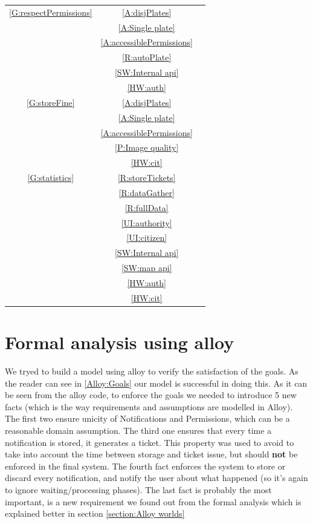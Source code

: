 \documentclass{article}
\begin{document}
\begin{table}[H]
\begin{center}
\begin{tabular}{|c|c|c|}
			\hline
				\ref{G:respectPermissions}	&\ref{A:disjPlates}						&\\
											&\ref{A:Single plate}					&\\
											&\ref{A:accessiblePermissions}			&\\
											&\ref{R:autoPlate}						&\\
											&\ref{SW:Internal api}					&\\
											&\ref{HW:auth}							&\\
			\hline
				\ref{G:storeFine}			&\ref{A:disjPlates}						&\\
											&\ref{A:Single plate}					&\\
											&\ref{A:accessiblePermissions}			&\\
											&\ref{P:Image quality}					&\\		
											&\ref{HW:cit}							&\\
			\hline
				\ref{G:statistics}			&\ref{R:storeTickets}					&\\
											&\ref{R:dataGather}						&\\
											&\ref{R:fullData}						&\\
											&\ref{UI:authority}						&\\
											&\ref{UI:citizen}						&\\
											&\ref{SW:Internal api}					&\\
											&\ref{SW:map api}						&\\
											&\ref{HW:auth}							&\\
											&\ref{HW:cit}							&\\
			\hline
										
				\end{tabular}
			\end{center}
		\end{table}
		
\newpage
\section{Formal analysis using alloy}
	We tryed to build a model using alloy to verify the satisfaction of the goals. As the reader can see in \ref{Alloy:Goals} our model is
	successful in doing this.
	As it can be seen from the alloy code, to enforce the goals we needed to introduce 5 new facts (which is the way requirements and assumptions 
	are modelled
	in Alloy). The first two ensure unicity of Notifications and Permissions, which can be a reasonable domain assumption. The third one ensures 
	that every time a notification is stored, it generates a ticket. This property was used to avoid to take into account the time between storage
	and ticket issue, but should \textbf{not} be enforced in the final system. The fourth fact enforces the system to store or
	discard every notification, and notify the user about what happened (so it's again to ignore waiting/processing phases).
	The last fact is probably the most important, is a new requirement we found out from the formal analysis which is explained better in section \ref{section:Alloy worlds}
	
\end{document}
